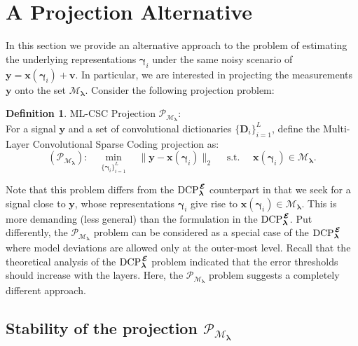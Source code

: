 \documentclass[10pt,journal]{IEEEtran}
\def\x{{\mathbf x}}
\def\v{{\mathbf v}}
\def\y{{\mathbf y}}
\def\D{{\mathbf D}}
\def\M{{\mathcal{M}}}
\def\P{{\mathcal{P}}}
\def\gama{{\boldsymbol \gamma}}
\def\lamda{{\boldsymbol \lambda}}
\def\vps{{\bm{\mathbf{\mathcal{E}}}}}
\def\DCPE{{\text{DCP}_\lamda^{\hspace{0.04cm} \vps}}}
\def\MEP{{\text{M}\vps\text{P}}}
\def\PM{{\P_{\M_\lamda}}}
\theoremstyle{plain}
\theoremstyle{definition}
\newtheorem{defn}[thm]{Definition} %
\begin{document}
\section{A Projection Alternative}
\label{sec:Projection}

In this section we provide an alternative approach to the problem of estimating the underlying representations $\gama_i$ under the same noisy scenario of $\y = \x(\gama_i) + \v$. In particular, we are interested in projecting the measurements $\y$ onto the set $\M_\lamda$. 
Consider the following projection problem:

\begin{defn}{ML-CSC Projection $\P_{\M_\lamda}$:}\\
	For a signal $\y$ and a set of convolutional dictionaries $\{ \D_i \}_{i=1}^L$, define the Multi-Layer Convolutional Sparse Coding projection as:
	\begin{equation}
	 (\PM): \quad \min_{\{\gama_i\}_{i=1}^L} \quad \| \y - \x(\gama_i) \|_2 \quad \text{ s.t. } \quad \x(\gama_i) \in \M_\lamda.
	\label{Eq:PMproblem}
	\end{equation}
\end{defn}
\noindent
Note that this problem differs from the $\DCPE$ counterpart in that we seek for a signal close to $\y$, whose representations $\gama_i$ give rise to $\x(\gama_i) \in \M_{\lamda}$. This is more demanding (less general) than the formulation in the $\DCPE$. %
Put differently, the $\PM$ problem can be considered %
as a special case of the $\DCPE$ where model deviations are allowed only at the outer-most level. %
Recall that the theoretical analysis of the $\DCPE$ problem indicated that the error thresholds should increase with the layers. Here, the $\PM$ problem suggests a completely different approach.

\subsection{Stability of the projection $\PM$}
\end{document}
